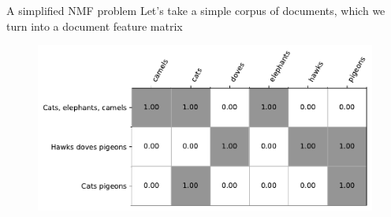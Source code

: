 \documentclass[
  10pt,
  ignorenonframetext,
  aspectratio=169]{beamer}
\begin{document}
\begin{frame}{A simplified NMF problem}
\protect\hypertarget{a-simplified-nmf-problem-2}{}
Let's take a simple corpus of documents, which we turn into a document
feature matrix

\begin{figure}
\includegraphics[width=0.9\linewidth]{plots/V.pdf}
\end{figure}
\end{frame}
\end{document}
